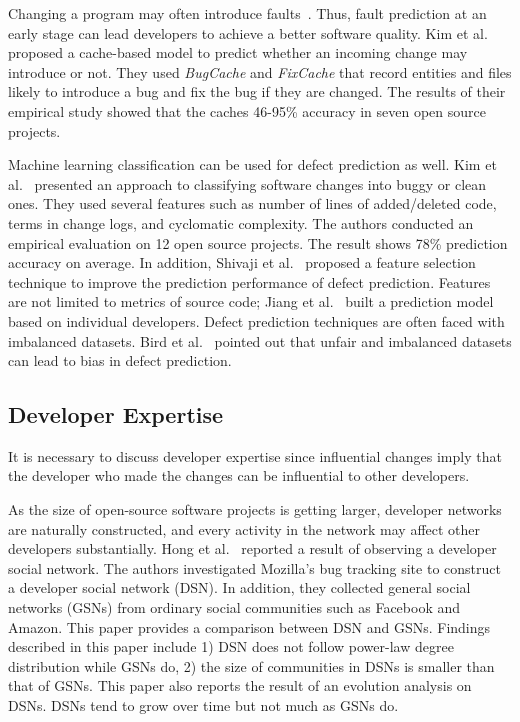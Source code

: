 Changing a program may often introduce
faults~\cite{sliwerski_hatari:_2005,kim_automatic_2006}.
Thus, fault prediction at an early stage can lead developers to achieve
a better software quality. Kim et al.~\cite{kim_predicting_2007} proposed a
cache-based model to predict whether an incoming change may introduce or not.
They used \emph{BugCache} and \emph{FixCache} that record entities and files
likely to introduce a bug and fix the bug if they are changed. The results of
their empirical study showed that the caches 46-95\% accuracy in seven open
source projects.

Machine learning classification can be used for defect prediction as well. Kim
et al.~\cite{kim_classifying_2008} presented an approach to classifying
software changes into buggy or clean ones. They used several features such as number of
lines of added/deleted code, terms in change logs, and cyclomatic complexity.
The authors conducted an empirical evaluation on 12 open source projects. The
result shows 78\% prediction accuracy on average. In addition, Shivaji et
al.~\cite{shivaji_reducing_2009} proposed a feature selection technique to
improve the prediction performance of defect prediction. Features are not
limited to metrics of source code; Jiang et al.~\cite{jiang_personalized_2013}
built a prediction model based on individual developers. Defect prediction
techniques are often faced with imbalanced datasets. Bird et
al.~\cite{bird_fair_2009} pointed out that unfair and imbalanced datasets can
lead to bias in defect prediction.


\subsection{Developer Expertise}

It is necessary to discuss developer expertise since influential changes imply
that the developer who made the changes can be influential to other developers.

As the size of open-source software projects is getting larger, developer
networks are naturally constructed, and every activity in the network may affect
other developers substantially. Hong et al.~\cite{hong_understanding_2011}
reported a result of observing a developer social network. The authors
investigated Mozilla's bug tracking site to construct a developer social network
(DSN). In addition, they collected general social networks (GSNs) from ordinary
social communities such as Facebook and Amazon. This paper provides a
comparison between DSN and GSNs. Findings described in this paper include 1) DSN
does not follow power-law degree distribution while GSNs do, 2) the size of
communities in DSNs is smaller than that of GSNs. This paper also reports the
result of an evolution analysis on DSNs. DSNs tend to grow over time but not much as
GSNs do.

